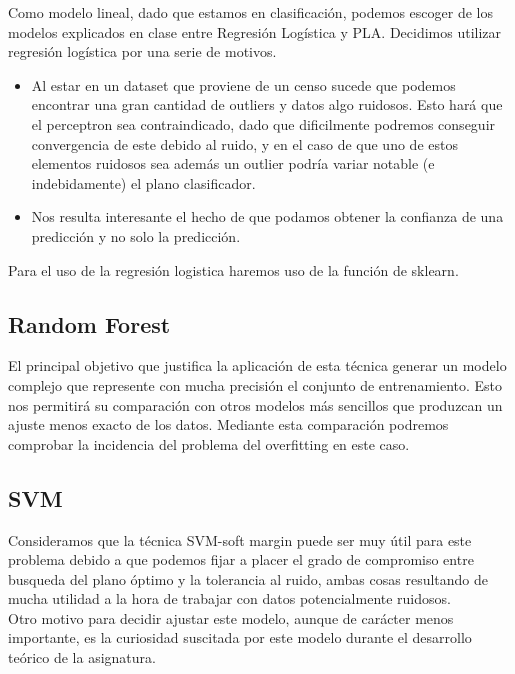 \documentclass[11pt,a4paper]{article}
\begin{document}
	Como modelo lineal, dado que estamos en clasificación, podemos escoger de los modelos explicados en clase entre Regresión Logística y  PLA. Decidimos utilizar regresión logística por una serie de motivos.
	
	\begin{itemize}
	\item Al estar en un dataset que proviene de un censo sucede que podemos encontrar una gran cantidad de outliers y datos algo ruidosos. Esto hará que el perceptron sea contraindicado, dado que dificilmente podremos conseguir convergencia de este debido al ruido, y en el caso de que uno de estos elementos ruidosos sea además un outlier podría variar notable (e indebidamente) el plano clasificador.
	\item Nos resulta interesante el hecho de que podamos obtener la confianza de una predicción y no solo la predicción.
\end{itemize}

Para el uso de la regresión logistica haremos uso de la función de sklearn. 

\subsection{Random Forest}

El principal objetivo que justifica la aplicación de esta técnica generar un modelo complejo que represente con mucha precisión el conjunto de entrenamiento. Esto nos permitirá su comparación con otros modelos más sencillos que produzcan un ajuste menos exacto de los datos. Mediante esta comparación podremos comprobar la incidencia del problema del overfitting en este caso.

\subsection{SVM}

Consideramos que la técnica SVM-soft margin puede ser muy útil para este problema debido a que podemos fijar a placer el grado de compromiso entre busqueda del plano óptimo y la tolerancia al ruido, ambas cosas resultando de mucha utilidad a la hora de trabajar con datos potencialmente ruidosos.\\

Otro motivo para decidir ajustar este modelo, aunque de carácter menos importante, es la curiosidad suscitada por este modelo durante el desarrollo teórico de la asignatura. 
\end{document}
